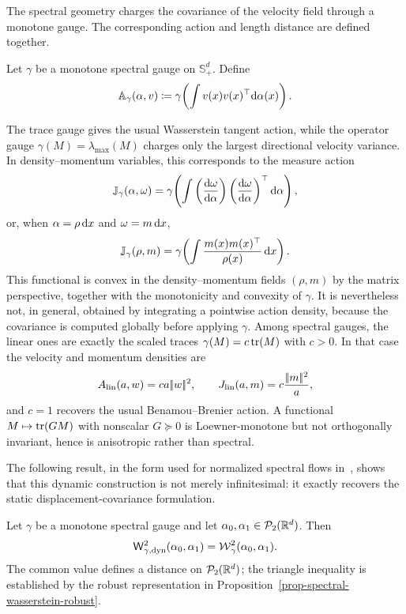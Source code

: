 The spectral geometry charges the covariance of the velocity field through a monotone gauge. The corresponding action and length distance are defined together.
\begin{defn}\label{def-dynamic-spectral-wasserstein}
Let $\gamma$ be a monotone spectral gauge on $\mathbb S_+^d$. Define
\begin{equation}\label{eq-spectral-tangent-action}
	\mathbb A_\gamma(\alpha,v)
	\coloneqq
	\gamma\!\left(\int v(x)v(x)^\top\mathrm{d}\alpha(x)\right).
\end{equation}
\end{defn}
The trace gauge gives the usual Wasserstein tangent action, while the operator gauge $\gamma(M)=\lambda_{\max}(M)$ charges only the largest directional velocity variance.
In density--momentum variables, this corresponds to the measure action
\[
	\mathbb J_\gamma(\alpha,\omega)
	=
	\gamma\!\left(\int
	\left(\frac{\mathrm{d}\omega}{\mathrm{d}\alpha}\right)
	\left(\frac{\mathrm{d}\omega}{\mathrm{d}\alpha}\right)^\top
	\mathrm{d}\alpha\right),
\]
or, when \(\alpha=\rho\,\mathrm{d} x\) and \(\omega=m\,\mathrm{d} x\),
\[
	\mathbb J_\gamma(\rho,m)
	=
	\gamma\!\left(\int \frac{m(x)m(x)^\top}{\rho(x)}\,\mathrm{d} x\right).
\]
This functional is convex in the density--momentum fields \((\rho,m)\) by the matrix perspective, together with the monotonicity and convexity of \(\gamma\). It is nevertheless not, in general, obtained by integrating a pointwise action density, because the covariance is computed globally before applying \(\gamma\). Among spectral gauges, the linear ones are exactly the scaled traces $\gamma(M)=c\operatorname{tr}(M)$ with $c>0$. In that case the velocity and momentum densities are
\[
	A_{\mathrm{lin}}(a,w)=ca|\!| w |\!|^2,
	\qquad
	J_{\mathrm{lin}}(a,m)=c\frac{|\!| m |\!|^2}{a},
\]
and $c=1$ recovers the usual Benamou--Brenier action. A functional $M\mapsto\operatorname{tr}(GM)$ with nonscalar $G\succeq0$ is Loewner-monotone but not orthogonally invariant, hence is anisotropic rather than spectral.

The following result, in the form used for normalized spectral flows in~\cite{peyre2026muon}, shows that this dynamic construction is not merely infinitesimal: it exactly recovers the static displacement-covariance formulation.

\begin{prop}\label{prop-static-dynamic-spectral-wasserstein}
	Let $\gamma$ be a monotone spectral gauge and let $\alpha_0,\alpha_1\in\mathcal{P}_2(\mathbb{R}^d)$. Then
	\[
		\mathsf W_{\gamma,\mathrm{dyn}}^2(\alpha_0,\alpha_1)
		=
		\operatorname{\mathcal{W}}_\gamma^2(\alpha_0,\alpha_1).
	\]
	The common value defines a distance on $\mathcal{P}_2(\mathbb{R}^d)$; the triangle inequality is established by the robust representation in Proposition~\ref{prop-spectral-wasserstein-robust}.
\end{prop}

